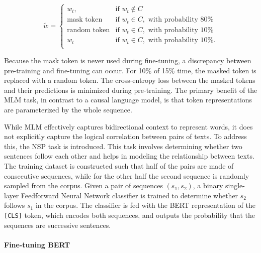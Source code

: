 \begin{equation}
    \tilde{w} = 
\begin{cases}
    w_t,               & \text{if } w_t \notin C\\
    \text{mask token}       & \text{if } w_t \in C, \text{ with probability 80\%} \\
    \text{random token}       & \text{if } w_t \in C, \text{ with probability 10\%} \\
    w_t       & \text{if } w_t \in C, \text{ with probability 10\%.} \\
\end{cases}
\end{equation}

\noindent Because the mask token is never used during fine-tuning, a discrepancy between pre-training and fine-tuning can occur. For 10\% of 15\% time, the masked token is replaced with a random token. The cross-entropy loss between the masked tokens and their predictions is minimized during pre-training. The primary benefit of the \ac{MLM} task, in contrast to a causal language model, is that token representations are parameterized by the whole sequence.

While \ac{MLM} effectively captures bidirectional context to represent words, it does not explicitly capture the logical correlation between pairs of texts. To address this, the \ac{NSP} task is introduced. This task involves determining whether two sentences follow each other and helps in modeling the relationship between texts. The training dataset is constructed such that half of the pairs are made of consecutive sequences, while for the other half the second sequence is randomly sampled from the corpus. Given a pair of sequences $(s_1, s_2)$, a binary single-layer Feedforward Neural Network classifier is trained to determine whether $s_2$ follows $s_1$ in the corpus. The classifier is fed with the \ac{BERT} representation of the \texttt{[CLS]} token, which encodes both sequences, and outputs the probability that the sequences are successive sentences. 


\paragraph{Fine-tuning BERT}

